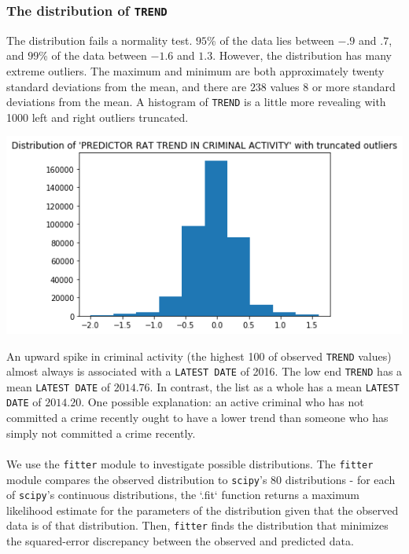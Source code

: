 \subsubsection{The distribution of \texttt{TREND}}
The distribution fails a normality test. $95$\% of the data lies between $-.9$ and $.7$, and $99$\% of the data between $-1.6$ and $1.3$. However, the distribution has many extreme outliers. The maximum and minimum are both approximately twenty standard deviations from the mean, and there are $238$ values 8 or more standard deviations from the mean. A histogram of \texttt{TREND} is a little more revealing with 1000 left and right outliers truncated.
\begin{center}
\includegraphics[scale=.8]{images/trends.png}
\end{center}
An upward spike in criminal activity (the highest 100 of observed \texttt{TREND} values) almost always is associated with a \texttt{LATEST DATE} of 2016. The low end \texttt{TREND} has a mean \texttt{LATEST DATE} of $2014.76$. In contrast, the list as a whole has a mean \texttt{LATEST DATE} of $2014.20$. One possible explanation: an active criminal who has not committed a crime recently ought to have a lower trend than someone who has simply not committed a crime recently.\\\\
We use the \texttt{fitter} module to investigate possible distributions. The \texttt{fitter} module compares the observed distribution to \texttt{scipy}'s 80 distributions - for each of \texttt{scipy}'s continuous distributions, the `.fit` function returns a maximum likelihood estimate for the parameters of the distribution given that the observed data is of that distribution. Then, \texttt{fitter} finds the distribution that minimizes the squared-error discrepancy between the observed and predicted data.\\\\
